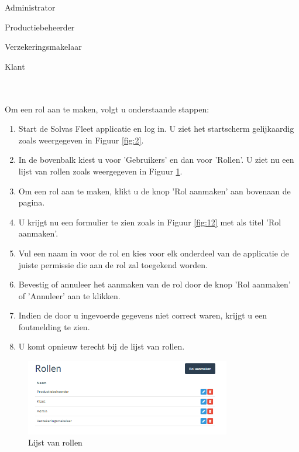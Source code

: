 \documentclass[11pt,openany]{article}
\newcommand{\cmark}{\ding{51}}%
\newcommand{\xmark}{\ding{55}}%
\newcommand{\done}{\rlap{$\square$}{\raisebox{2pt}{\large\hspace{1pt}\cmark}}%
	\hspace{-2.5pt}}
\newcommand{\wontfix}{\rlap{$\square$}{\large\hspace{1pt}\xmark}}
\begin{document}
\begin{todolist}
	\item[\done] Administrator
	\item[\wontfix] Productiebeheerder
	\item[\wontfix] Verzekeringsmakelaar
	\item[\wontfix] Klant 
\end{todolist}
\\
\\
Om een rol aan te maken, volgt u onderstaande stappen:
\begin{enumerate}
	\item Start de Solvas Fleet applicatie en log in. U ziet het startscherm gelijkaardig zoals weergegeven in Figuur \ref{fig:2}.
	\item In de bovenbalk kiest u voor 'Gebruikers' en dan voor 'Rollen'. U ziet nu een lijst van rollen zoals weergegeven in Figuur \ref{fig:11}.
	\item Om een rol aan te maken, klikt u de knop 'Rol aanmaken' aan bovenaan de pagina. 
	\item U krijgt nu een formulier te zien zoals in Figuur \ref{fig:12} met als titel 'Rol aanmaken'.
	\item Vul een naam in voor de rol en kies voor elk onderdeel van de applicatie de juiste permissie die aan de rol zal toegekend worden.
	\item Bevestig of annuleer het aanmaken van de rol door de knop 'Rol aanmaken' of 'Annuleer' aan te klikken.
	\item Indien de door u ingevoerde gegevens niet correct waren, krijgt u een foutmelding te zien.
	\item U komt opnieuw terecht bij de lijst van rollen.
	
\end{enumerate}
\begin{figure}
	\centering
	\includegraphics[width=0.8\textwidth]{img/fig11.png}
	\caption{Lijst van rollen} 
	\label{fig:11} 
\end{figure}
\end{document}
